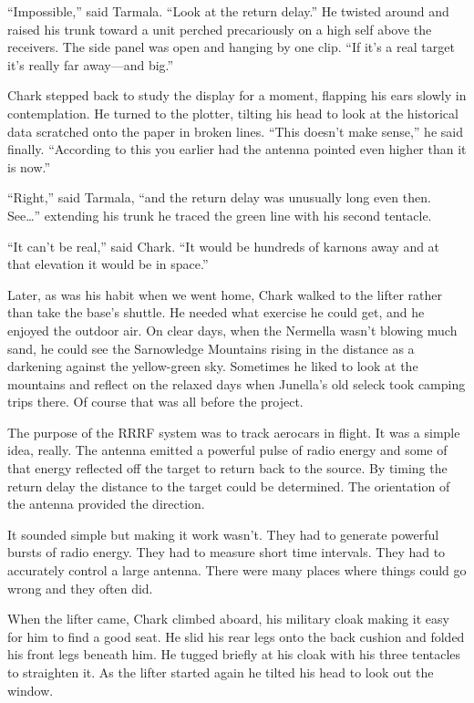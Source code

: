``Impossible,'' said Tarmala. ``Look at the return delay.'' He twisted around and raised his
trunk toward a unit perched precariously on a high self above the receivers. The side panel was
open and hanging by one clip. ``If it's a real target it's really far away---and big.''

Chark stepped back to study the display for a moment, flapping his ears slowly in contemplation.
He turned to the plotter, tilting his head to look at the historical data scratched onto the
paper in broken lines. ``This doesn't make sense,'' he said finally. ``According to this you
earlier had the antenna pointed even higher than it is now.''

``Right,'' said Tarmala, ``and the return delay was unusually long even then. See\ldots''
extending his trunk he traced the green line with his second tentacle.

``It can't be real,'' said Chark. ``It would be hundreds of karnons away and at that elevation
it would be in space.''

Later, as was his habit when we went home, Chark walked to the lifter rather than take the
base's shuttle. He needed what exercise he could get, and he enjoyed the outdoor air. On clear
days, when the Nermella wasn't blowing much sand, he could see the Sarnowledge Mountains rising
in the distance as a darkening against the yellow-green sky. Sometimes he liked to look at the
mountains and reflect on the relaxed days when Junella's old seleck took camping trips there. Of
course that was all before the project.

The purpose of the RRRF system was to track aerocars in flight. It was a simple idea, really.
The antenna emitted a powerful pulse of radio energy and some of that energy reflected off the
target to return back to the source. By timing the return delay the distance to the target could
be determined. The orientation of the antenna provided the direction.

It sounded simple but making it work wasn't. They had to generate powerful bursts of radio
energy. They had to measure short time intervals. They had to accurately control a large
antenna. There were many places where things could go wrong and they often did.

When the lifter came, Chark climbed aboard, his military cloak making it easy for him to find a
good seat. He slid his rear legs onto the back cushion and folded his front legs beneath him. He
tugged briefly at his cloak with his three tentacles to straighten it. As the lifter started
again he tilted his head to look out the window.

